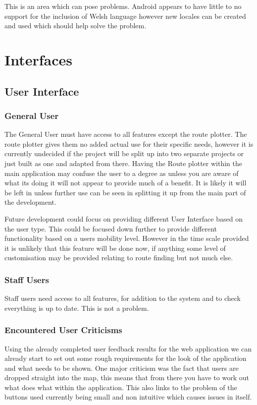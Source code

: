 \documentclass[10pt,a4paper]{article}
\begin{document}
This is an area which can pose problems. Android appears to have little to no support for the inclusion of Welsh language however new locales can be created and used which should help solve the problem. 

\section{Interfaces}
\subsection{User Interface}
\subsubsection{General User}
The General User must have access to all features except the route plotter. The route plotter gives them no added actual use for their specific needs, however it is currently undecided if the project will be split up into two separate projects or just built as one and adapted from there. Having the Route plotter within the main application may confuse the user to a degree as unless you are aware of what its doing it will not appear to provide much of a benefit. It is likely it will be left in unless further use can be seen in splitting it up from the main part of the development.

Future development could focus on providing different User Interface based on the user type. This could be focused down further to provide different functionality based on a users mobility level. However in the time scale provided it is unlikely that this feature will be done now, if anything some level of customisation may be provided relating to route finding but not much else.
\subsubsection{Staff Users}
Staff users need access to all features, for addition to the system and to check everything is up to date. This is not a problem.
\subsubsection{Encountered User Criticisms}
Using the already completed user feedback results for the web application we can already start to set out some rough requirements for the look of the application and what needs to be shown. One major criticism was the fact that users are dropped straight into the map, this means that from there you have to work out what does what within the application. This also links to the problem of the buttons used currently being small and non intuitive which causes issues in itself.
\end{document}
